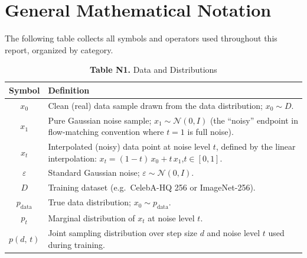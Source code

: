 
\section*{General Mathematical Notation}
\label{sec:notation}

The following table collects all symbols and operators used throughout this
report, organized by category.

\renewcommand{\arraystretch}{1.5}

\begin{table}[h]
\centering
\caption*{\textbf{Table N1.} Data and Distributions}
\begin{tabular}{@{} c p{10cm} @{}}
\toprule
\textbf{Symbol} & \textbf{Definition} \\
\midrule
$x_0$
  & Clean (real) data sample drawn from the data distribution;
    $x_0 \sim D$. \\
$x_1$
  & Pure Gaussian noise sample;
    $x_1 \sim \mathcal{N}(0, I)$ (the ``noisy'' endpoint in flow-matching
    convention where $t=1$ is full noise). \\
$x_t$
  & Interpolated (noisy) data point at noise level $t$, defined by the
    linear interpolation:
    $x_t = (1-t)\,x_0 + t\,x_1$,\quad $t \in [0,1]$. \\
$\varepsilon$
  & Standard Gaussian noise; $\varepsilon \sim \mathcal{N}(0, I)$. \\
$D$
  & Training dataset (e.g.\ CelebA-HQ 256 or ImageNet-256). \\
$p_{\mathrm{data}}$
  & True data distribution; $x_0 \sim p_{\mathrm{data}}$. \\
$p_t$
  & Marginal distribution of $x_t$ at noise level $t$. \\
$p(d,\,t)$
  & Joint sampling distribution over step size $d$ and noise level $t$
    used during training. \\
\bottomrule
\end{tabular}
\end{table}

